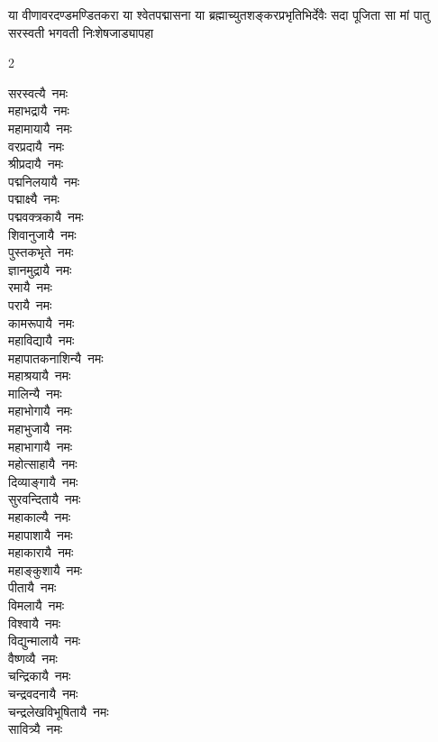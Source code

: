 {या वीणावरदण्डमण्डितकरा या श्वेतपद्मासना}
{या ब्रह्माच्युतशङ्करप्रभृतिभिर्देवैः सदा पूजिता}
{सा मां पातु सरस्वती भगवती निःशेषजाड्यापहा}

\begin{multicols}{2}
\begin{flushleft}
सरस्वत्यै~नमः\\
महाभद्रायै~नमः\\
महामायायै~नमः\\
वरप्रदायै~नमः\\
श्रीप्रदायै~नमः\\
पद्मनिलयायै~नमः\\
पद्माक्ष्यै~नमः\\
पद्मवक्त्रकायै~नमः\\
शिवानुजायै~नमः\\
पुस्तकभृते~नमः\hfill{}\\
ज्ञानमुद्रायै~नमः\\
रमायै~नमः\\
परायै~नमः\\
कामरूपायै~नमः\\
महाविद्यायै~नमः\\
महापातकनाशिन्यै~नमः\\
महाश्रयायै~नमः\\
मालिन्यै~नमः\\
महाभोगायै~नमः\\
महाभुजायै~नमः\hfill{}\\
महाभागायै~नमः\\
महोत्साहायै~नमः\\
दिव्याङ्गायै~नमः\\
सुरवन्दितायै~नमः\\
महाकाल्यै~नमः\\
महापाशायै~नमः\\
महाकारायै~नमः\\
महाङ्कुशायै~नमः\\
पीतायै~नमः\\
विमलायै~नमः\hfill{}\\
विश्वायै~नमः\\
विद्युन्मालायै~नमः\\
वैष्णव्यै~नमः\\
चन्द्रिकायै~नमः\\
चन्द्रवदनायै~नमः\\
चन्द्रलेखविभूषितायै~नमः\\
सावित्र्यै~नमः\\

\end{flushleft}
\end{multicols}
